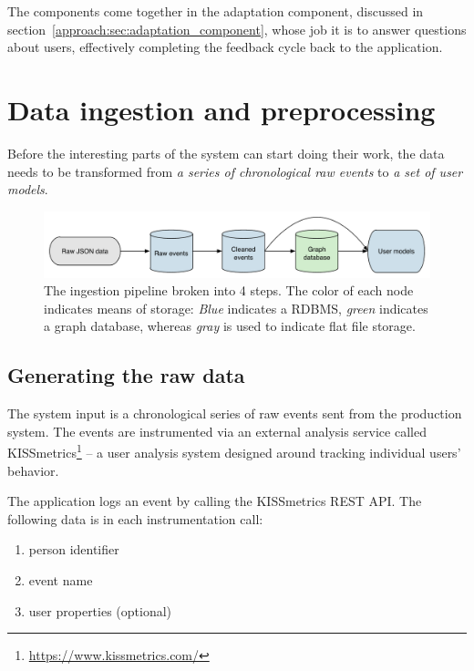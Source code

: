 The components come together in the adaptation component, discussed in section~\ref{approach:sec:adaptation_component}, whose job it is to answer questions about users, effectively completing the feedback cycle back to the application.


\section{Data ingestion and preprocessing} %
\label{approach:sec:data_ingestion_and_preprocessing}

Before the interesting parts of the system can start doing their work, the data needs to be transformed from \emph{a series of chronological raw events} to \emph{a set of user models}.

\begin{figure}[h]
  \centering
    \includegraphics[width=\textwidth]{Figures/ingestion-pipeline}
  \caption{The ingestion pipeline broken into 4 steps. The color of each node indicates means of storage: \emph{Blue} indicates a RDBMS, \emph{green} indicates a graph database, whereas \emph{gray} is used to indicate flat file storage.}
  \label{fig:ingestion-pipeline}
\end{figure}

\subsection{Generating the raw data}
\label{approach:sub:generating_data}

The system input is a chronological series of raw events sent from the production system. The events are instrumented via an external analysis service called KISSmetrics\footnote{\url{https://www.kissmetrics.com/}} -- a user analysis system designed around tracking individual users' behavior.

The application logs an event by calling the KISSmetrics REST API. The following data is in each instrumentation call:

\begin{enumerate}
  \item person identifier
  \item event name
  \item user properties (optional)
\end{enumerate}

